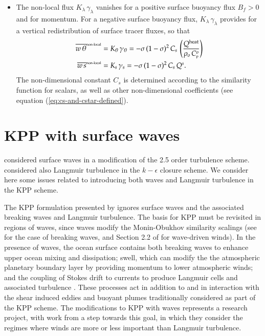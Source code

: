 \begin{itemize}
\item The non-local flux $K_{\lambda} \, \gamma_{\lambda}$ vanishes
  for a positive surface buoyancy flux $B_{f} > 0$ and for momentum.
  For a negative surface buoyancy flux, $K_{\lambda} \,
  \gamma_{\lambda}$ provides for a vertical redistribution of surface
  tracer fluxes, so that
\begin{subequations}
\begin{align}
\overline{w \, \theta}^{\mbox{\tiny non-local}} &= K_{\theta}  \, \gamma_{\theta} = 
 - \sigma \, (1-\sigma)^{2} \, C_{s} \, \left( \frac{ Q^{\mbox{\scriptsize heat}}}{ \rho_{o}  \, C_{\mbox{\tiny p}}^{o} } \right)
\label{eq:non-local-flux-kpp-param-temp-summary}
\\
\overline{w \, s}^{\mbox{\tiny non-local}} &= K_{s}  \, \gamma_{s}  = 
 -\sigma \, (1-\sigma)^{2}  \, C_{s} \,  Q^{s}.
\label{eq:non-local-flux-kpp-param-scalar-summary}
\end{align}
\end{subequations}
The non-dimensional constant $C_{s}$ is determined according to the
similarity function for scalars, as well as other non-dimensional
coefficients (see equation (\ref{eq:cs-and-cstar-defined}).

\end{itemize}



\section{KPP with surface waves}
\label{section:surface-waves-and-kpp}

\cite{Craig_Banner_1994} considered surface waves in a modification of
the \cite{MellorYamada1982} 2.5 order turbulence scheme.
\cite{Axell_2002} considered also Langmuir turbulence in the
$k-\epsilon$ closure scheme.  We consider here some issues related to
introducing both waves and Langmuir turbulence in the KPP scheme.

The KPP formulation presented by \cite{LargeKPP} ignores surface waves
and the associated breaking waves and Langmuir turbulence.  The basis
for KPP must be revisited in regions of waves, since waves modify the
Monin-Obukhov similarity scalings (see \cite{Terray_etal1996} for the
case of breaking waves, and Section 2.2 of
\cite{SullivanMcWilliams2010} for wave-driven winds).  In the presence
of waves, the ocean surface contains both breaking waves to enhance
upper ocean mixing and dissipation; swell, which can modify the the
atmospheric planetary boundary layer by providing momentum to lower
atmospheric winds; and the coupling of Stokes drift to currents to
produce Langmuir cells and associated turbulence
\citep{McWilliams_etal1997}.  These processes act in addition to and
in interaction with the shear induced eddies and buoyant plumes
traditionally considered as part of the KPP scheme.  The modifications
to KPP with waves represents a research project, with work from
\cite{Belcher_etal2012} a step towards this goal, in which they
consider the regimes where winds are more or less important than
Langmuir turbulence.

